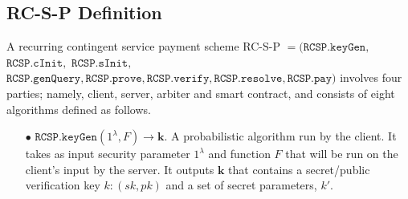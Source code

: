 
\subsection{RC-S-P Definition}\label{sec::RC-S-P-Definition}


\begin{definition}[RC-S-P Scheme]\label{RC-S-P-def}
A recurring contingent service payment scheme RC-S-P  $=(\mathtt{RCSP}.\mathtt{keyGen}, $ $\mathtt{RCSP}.\mathtt{cInit}, $ $\mathtt{RCSP}.\mathtt{sInit},  $ $\mathtt{RCSP}.\mathtt{genQuery},\mathtt{RCSP}.\mathtt{prove},\mathtt{RCSP}.\mathtt{verify},\mathtt{RCSP}.\mathtt{resolve},\mathtt{RCSP}.\mathtt{pay})$ involves four parties; namely, client, server, arbiter and smart contract, and consists of eight algorithms defined as follows.


\begin{itemize}

\item[$\bullet$] $\mathtt{RCSP}.\mathtt{keyGen}(1^{\scriptscriptstyle\lambda},F)\rightarrow \bm{k}$.  A probabilistic algorithm run by the client. It takes as input security parameter $1^{\scriptscriptstyle\lambda}$  and  function $F$ that will be run on the client's input by the server. It outputs $\bm{k}$ that contains a secret/public verification key $k:(sk,pk)$ and a set of secret parameters, $k'$. %

\


\end{itemize}
\end{definition}
